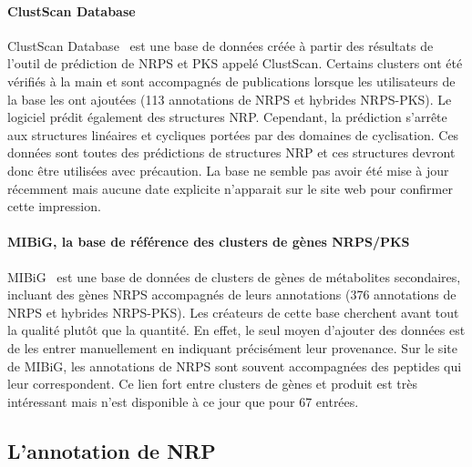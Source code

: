 \documentclass[12pt,french,twoside]{report}
\begin{document}
\paragraph{ClustScan Database}
ClustScan Database~\cite{diminic_databases_2013} est une base de données créée à partir des résultats de l'outil de prédiction de NRPS et PKS appelé ClustScan.
Certains clusters ont été vérifiés à la main et sont accompagnés de publications lorsque les utilisateurs de la base les ont ajoutées (113 annotations de NRPS et hybrides NRPS-PKS).
Le logiciel prédit également des structures NRP.
Cependant, la prédiction s'arrête aux structures linéaires et cycliques portées par des domaines de cyclisation.
Ces données sont toutes des prédictions de structures NRP et ces structures devront donc être utilisées avec précaution.
La base ne semble pas avoir été mise à jour récemment mais aucune date explicite n'apparait sur le site web pour confirmer cette impression.


\paragraph{MIBiG, la base de référence des clusters de gènes NRPS/PKS}
MIBiG~\cite{medema_minimum_2015} est une base de données de clusters de gènes de métabolites secondaires, incluant des gènes NRPS accompagnés de leurs annotations (376 annotations de NRPS et hybrides NRPS-PKS).
Les créateurs de cette base cherchent avant tout la qualité plutôt que la quantité.
En effet, le seul moyen d'ajouter des données est de les entrer manuellement en indiquant précisément leur provenance.
Sur le site de MIBiG, les annotations de NRPS sont souvent accompagnées des peptides qui leur correspondent.
Ce lien fort entre clusters de gènes et produit est très intéressant mais n'est disponible à ce jour que pour 67 entrées.



\subsection{L'annotation de NRP}
\end{document}
